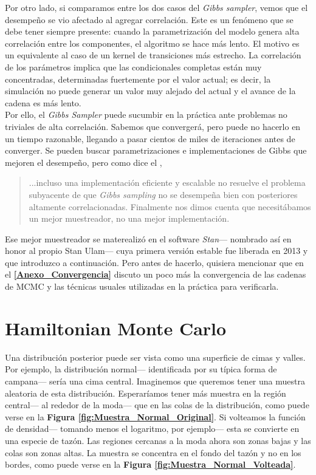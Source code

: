 Por otro lado, si comparamos entre los dos casos del \textit{Gibbs sampler}, vemos que el desempeño se vio afectado al agregar correlación. Este es un fenómeno que se debe tener siempre presente: cuando la parametrización del modelo genera alta correlación entre los componentes, el algoritmo se hace más lento. El motivo es un equivalente al caso de un kernel de transiciones más estrecho. La correlación de los parámetros implica que las condicionales completas están muy concentradas, determinadas fuertemente por el valor actual; es decir, la simulación no puede generar un valor muy alejado del actual y el avance de la cadena es más lento.\\ 

Por ello, el \textit{Gibbs Sampler} puede sucumbir en la práctica ante problemas no triviales de alta correlación. Sabemos que convergerá, pero puede no hacerlo en un tiempo razonable, llegando a pasar cientos de miles de iteraciones antes de converger. Se pueden buscar parametrizaciones e implementaciones de Gibbs que mejoren el desempeño, pero como dice el \textcite{Stan17}, 
\begin{quote}
...incluso una implementación eficiente y escalable no resuelve el problema subyacente de que \textit{Gibbs sampling} no se desempeña bien con posteriores altamente correlacionadas. Finalmente nos dimos cuenta que necesitábamos un mejor muestreador, no una mejor implementación.
\end{quote}

Ese mejor muestreador se materealizó en el software \textit{Stan}--- nombrado así en honor al propio Stan Ulam--- cuya primera versión estable fue liberada en 2013 y que introduzco a continuación. Pero antes de hacerlo, quisiera mencionar que en el \textbf{\autoref{Anexo_Convergencia}} discuto un poco más la convergencia de las cadenas de MCMC y las técnicas usuales utilizadas en la práctica para verificarla.

\section{Hamiltonian Monte Carlo}

Una distribución posterior puede ser vista como una superficie de cimas y valles. Por ejemplo, la distribución normal--- identificada por su típica forma de campana--- sería una cima central. Imaginemos que queremos tener una muestra aleatoria de esta distribución. Esperaríamos tener más muestra en la región central--- al rededor de la moda--- que en las colas de la distribución, como puede verse en la \textbf{Figura \ref{fig:Muestra_Normal_Original}}. Si volteamos la función de densidad--- tomando menos el logaritmo, por ejemplo--- esta se convierte en una especie de tazón. Las regiones cercanas a la moda ahora son zonas bajas y las colas son zonas altas. La muestra se concentra en el fondo del tazón y no en los bordes, como puede verse en la \textbf{Figura \ref{fig:Muestra_Normal_Volteada}}.\\

